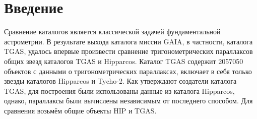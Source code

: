 \documentclass[14pt]{article} %
\def\sigspace{\\[1em]
\underline{\hspace{5cm}}\\[-0.2em]}
\begin{document}
\newpage
{}
\newpage
\tableofcontents
\newpage



 
\section{Введение}\label{introduction}


Сравнение каталогов является классической задачей фундаментальной астрометрии. В результате выхода каталога миссии GAIA, в частности, каталога TGAS, удалось впервые произвести сравнение тригонометрических параллаксов общих звезд каталогов TGAS и  Hipparcos. Каталог TGAS содержит 2057050 объектов с данными о тригонометрических параллаксах, включает в себя только звезды каталогов Hipparcos и Tycho-2. Как утверждают создатели каталога TGAS, для построения были использованы данные из каталога Hipparcos, однако, параллаксы были вычислены независимым от последнего способом. Для сравнения возьмём общие объекты HIP и TGAS.
\end{document}
